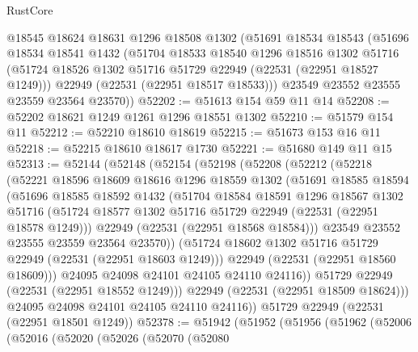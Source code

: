 \begin{lexlean}{RustCore}
\begin{coremodule}
    @18545
    @18624
    @18631
    @1296
    @18508
    @1302
    (@51691
      @18534
      @18543
      (@51696
        @18534
        @18541
        @1432
        (@51704
          @18533
          @18540
          @1296
          @18516
          @1302
          @51716
          (@51724 @18526 @1302 @51716 @51729 @22949 (@22531 (@22951 @18527 @1249)))
          @22949
          (@22531 (@22951 @18517 @18533)))
        @23549
        @23552
        @23555
        @23559
        @23564
        @23570))
@52202 := @51613 @154 @59 @11 @14
@52208 := @52202 @18621 @1249 @1261 @1296 @18551 @1302
@52210 := @51579 @154 @11
@52212 := @52210 @18610 @18619
@52215 := @51673 @153 @16 @11
@52218 := @52215 @18610 @18617 @1730
@52221 := @51680 @149 @11 @15
@52313 := @52144
    (@52148
      (@52154
        (@52198
          (@52208
            (@52212
              (@52218
                (@52221
                  @18596
                  @18609
                  @18616
                  @1296
                  @18559
                  @1302
                  (@51691
                    @18585
                    @18594
                    (@51696
                      @18585
                      @18592
                      @1432
                      (@51704
                        @18584
                        @18591
                        @1296
                        @18567
                        @1302
                        @51716
                        (@51724 @18577 @1302 @51716 @51729 @22949 (@22531 (@22951 @18578 @1249)))
                        @22949
                        (@22531 (@22951 @18568 @18584)))
                      @23549
                      @23552
                      @23555
                      @23559
                      @23564
                      @23570))
                  (@51724 @18602 @1302 @51716 @51729 @22949 (@22531 (@22951 @18603 @1249)))
                  @22949
                  (@22531 (@22951 @18560 @18609)))
                @24095
                @24098
                @24101
                @24105
                @24110
                @24116))
            @51729
            @22949
            (@22531 (@22951 @18552 @1249)))
          @22949
          (@22531 (@22951 @18509 @18624)))
        @24095
        @24098
        @24101
        @24105
        @24110
        @24116))
    @51729
    @22949
    (@22531 (@22951 @18501 @1249))
@52378 := @51942
    (@51952
      (@51956
        (@51962
          (@52006
            (@52016
              (@52020
                (@52026
                  (@52070
                    (@52080

\end{coremodule}
\end{lexlean}
